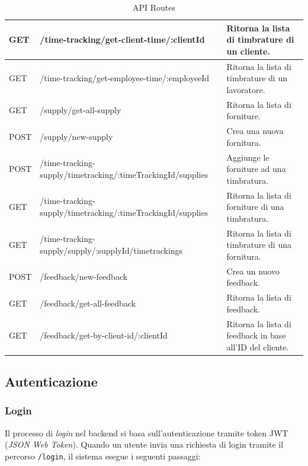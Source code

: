 \documentclass[twoside]{supsistudent}
\begin{document}
\begin{table}[h!]
{\begin{tabular}{|l|l|l|}
      GET                  & /time-tracking/get-client-time/:clientId                    & Ritorna la lista di timbrature di un cliente.            \\ \hline
      GET                  & /time-tracking/get-employee-time/:employeeId                & Ritorna la lista di timbrature di un lavoratore.         \\ \hline
      GET                  & /supply/get-all-supply                                      & Ritorna la lista di forniture.                           \\ \hline
      POST                 & /supply/new-supply                                          & Crea una nuova fornitura.                                \\ \hline
      POST                 & /time-tracking-supply/timetracking/:timeTrackingId/supplies & Aggiunge le forniture ad una timbratura.                 \\ \hline
      GET                  & /time-tracking-supply/timetracking/:timeTrackingId/supplies & Ritorna la lista di forniture di una timbratura.         \\ \hline
      GET                  & /time-tracking-supply/supply/:supplyId/timetrackings        & Ritorna la lista di timbrature di una fornitura.         \\ \hline
      POST                 & /feedback/new-feedback                                      & Crea un nuovo feedback.                                  \\ \hline
      GET                  & /feedback/get-all-feedback                                  & Ritorna la lista di feedback.                            \\ \hline
      GET                  & /feedback/get-by-client-id/:clientId                        & Ritorna la lista di feedback in base all'ID del cliente. \\ \hline
    \end{tabular}
  }
  \caption{API Routes}
  \label{tab:api_routes}
\end{table}

\subsection{Autenticazione}
\subsubsection{Login}

Il processo di \textit{login} nel backend si basa sull'autenticazione tramite token JWT (\textit{JSON Web Token}). Quando un utente invia una richiesta di login tramite il percorso \texttt{/login}, il sistema esegue i seguenti passaggi:
\end{document}
